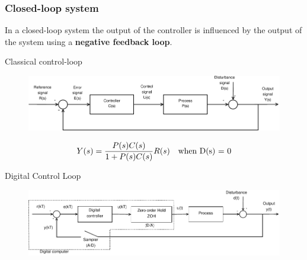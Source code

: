 \begin{frame}
	\frametitle{Closed-loop system}
	\begin{definition}
		In a closed-loop system the output of the controller is influenced by the output of the system using a \textbf{negative feedback loop}.
	\end{definition}
	\begin{block}{Classical control-loop}
		\begin{figure}
			\centering
			\includegraphics[width=0.9\linewidth]{Closed-Loop}
			\label{fig:Closed-Loop}
		\end{figure}
		\vspace{1em}
		\[ Y(s) =  \frac{P(s)C(s)}{1 + P(s)C(s)}R(s) \text{\quad when D(s) = 0}\]
	\end{block}
\end{frame}


\begin{frame}
	\begin{block}{Digital Control Loop}
		\begin{figure}
			\centering
			\includegraphics[width=1\linewidth]{digital-control-system}
			\label{fig:digital-control-system}
		\end{figure}
	\end{block}
\end{frame}

